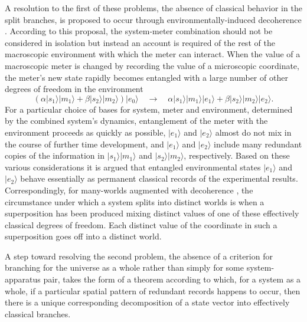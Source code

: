 \documentclass[12pt,amsmath,amssymb,onecolumn]{revtex4-2}
\begin{document}
A resolution to the first of these problems, the absence of 
classical behavior in the split branches, is proposed to occur through environmentally-induced decoherence 
\cite{Zeh, Zurek, Zurek1, Zurek2}.
According to this proposal, the system-meter combination should not be considered in isolation
but instead an account is required of the rest of the macroscopic environment with which the meter can interact.
When the value of a macroscopic meter is changed by recording the value of a microscopic coordinate, the meter's new state
rapidly becomes entangled with a large number of other degrees of freedom in the environment 
\begin{equation}
\label{entangled}
(\alpha |s_1 \rangle  |m_1 \rangle  + \beta |s_2 \rangle  |m_2 \rangle ) |e_0 \rangle  \quad \rightarrow \quad \alpha|s_1 \rangle  |m_1 \rangle  |e_1 \rangle  +  \beta |s_2 \rangle  |m_2 \rangle  |e_2 \rangle . 
\end{equation}
For a particular choice of bases for system, meter and environment, determined by the combined system's dynamics, entanglement
of the meter with the environment proceeds as quickly as possible,
$| e_1 \rangle $ and $| e_2 \rangle $ almost do not mix in the course of further time development,
and $|e_1 \rangle $ and $|e_2 \rangle $ include many redundant copies
of the information in $|s_1 \rangle  |m_1 \rangle $ and $|s_2 \rangle  |m_2 \rangle $, respectively.
Based on these various considerations it is argued that entangled environmental states
$|e_1 \rangle $ and $|e_2 \rangle $
behave essentially as permanent classical records of the experimental results.
Correspondingly, for many-worlds augmented with decoherence \cite{Wallace}, the circumstance 
under which a system splits into distinct worlds is when a superposition
has been produced mixing distinct values of one of these effectively classical 
degrees of freedom. Each distinct value of the coordinate in such a superposition
goes off into a distinct world. 

A step toward resolving the second problem, the absence of a criterion for branching
for the universe as a whole rather than simply for some system-apparatus pair, takes the form
of a theorem \cite{Riedel} according to which, for a system as a whole, 
if a particular spatial pattern of redundant records happens to occur,
then there is a unique corresponding decomposition of a state vector into effectively
classical branches.
\end{document}

